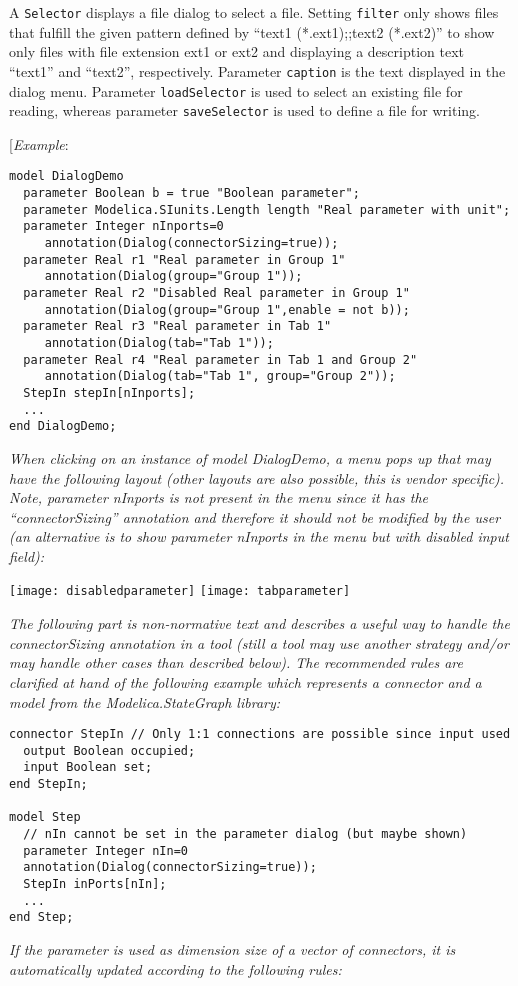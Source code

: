 A \lstinline!Selector! displays a file dialog to select a file. Setting \lstinline!filter! only
shows files that fulfill the given pattern defined by ``text1
(*.ext1);;text2 (*.ext2)'' to show only files with file extension
ext1 or ext2 and displaying a description text ``text1'' and
``text2'', respectively. Parameter \lstinline!caption! is the text displayed in the
dialog menu. Parameter \lstinline!loadSelector! is used to select an existing file
for reading, whereas parameter \lstinline!saveSelector! is used to define a file for
writing.

{[}\emph{Example}:

\begin{lstlisting}[language=modelica]
model DialogDemo
  parameter Boolean b = true "Boolean parameter";
  parameter Modelica.SIunits.Length length "Real parameter with unit";
  parameter Integer nInports=0
     annotation(Dialog(connectorSizing=true));
  parameter Real r1 "Real parameter in Group 1"
     annotation(Dialog(group="Group 1"));
  parameter Real r2 "Disabled Real parameter in Group 1"
     annotation(Dialog(group="Group 1",enable = not b));
  parameter Real r3 "Real parameter in Tab 1"
     annotation(Dialog(tab="Tab 1"));
  parameter Real r4 "Real parameter in Tab 1 and Group 2"
     annotation(Dialog(tab="Tab 1", group="Group 2"));
  StepIn stepIn[nInports];
  ...
end DialogDemo;
\end{lstlisting}
\emph{When clicking on an instance of model DialogDemo, a menu pops up
that may have the following layout (other layouts are also possible,
this is vendor specific). Note, parameter nInports is not present in the
menu since it has the ``connectorSizing'' annotation and therefore it
should not be modified by the user (an alternative is to show parameter
nInports in the menu but with disabled input field): }

\texttt{[image: disabledparameter]}
\texttt{[image: tabparameter]}

\emph{The following part is non-normative text and describes a useful
way to handle the connectorSizing annotation in a tool (still a tool may
use another strategy and/or may handle other cases than described
below). The recommended rules are clarified at hand of the following
example which represents a connector and a model from the
Modelica.StateGraph library:}

\begin{lstlisting}[language=modelica]
connector StepIn // Only 1:1 connections are possible since input used
  output Boolean occupied;
  input Boolean set;
end StepIn;

model Step
  // nIn cannot be set in the parameter dialog (but maybe shown)
  parameter Integer nIn=0
  annotation(Dialog(connectorSizing=true));
  StepIn inPorts[nIn];
  ...
end Step;
\end{lstlisting}
\emph{If the parameter is used as dimension size of a {vector of
connectors}, it is automatically updated according to the following
rules:}

